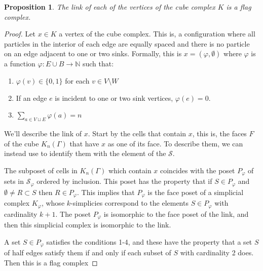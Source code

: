 \documentclass{article}
\newtheorem{proposition}{Proposition}
\begin{document}
\begin{proposition}
    The link of each of the vertices of the cube complex $K$ is a flag complex.
\end{proposition}
\begin{proof}
    Let $x\in K$ a vertex of the cube complex. This is, a configuration where all particles in the interior of each edge are equally spaced and there is no particle on an edge adjacent to one or two sinks. Formally, this is $x= (\varphi, \emptyset)$ where $\varphi$ is a function $\varphi: E\cup B\to \mathbb{N}$ such that:
    \begin{enumerate}
        \item[(a)] $\varphi(v)\in \{0,1\}$ for each $v\in V\setminus W$ 
        \item[(b)] If an edge $e$ is incident to one or two sink vertices, $\varphi(e)=0$.
        \item[(c)] $\sum_{a\in V \sqcup E} \varphi(a) = n$
    \end{enumerate}
    We'll describe the link of $x$. Start by the cells that contain $x$, this is, the faces $F$ of the cube $K_n(\mathsf{\Gamma})$ that have $x$ as one of its face. To describe them, we can instead use  to identify them with the element of the $\mathcal{S}$.
  

    The subposet of cells in $K_n(\mathsf{\Gamma})$ which contain $x$ coincides with the poset $P_{\varphi}$ of sets in $\mathcal{S}_{\varphi}$ ordered by inclusion. This poset has the property that if $S\in P_{\varphi}$ and $\emptyset \neq R\subset S$ then $R\in P_{\varphi}$. This implies that $P_{\varphi}$ is the face poset of a simplicial complex $K_{\varphi}$, whose $k$-simplicies correspond to  the elements $S\in P_{\varphi}$ with cardinality $k+1$. The poset $P_{\varphi}$ is isomorphic to the face poset of the link, and then this simplicial complex is isomorphic to the link.

     A set $S\in P_{\varphi}$ satisfies the conditions 1-4, and these have the property that a set $S$ of half edges satisfy them if and only if each subset of $S$ with cardinality 2 does. Then this is a flag complex
\end{proof}
\end{document}
